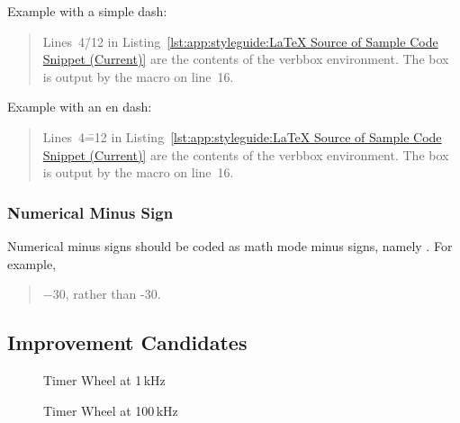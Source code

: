 Example with a simple dash:

\begin{quote}
  Lines~4\=/12 in
  Listing~\ref{lst:app:styleguide:LaTeX Source of Sample Code Snippet (Current)}
  are the contents of the verbbox environment. The box is output
  by the \co{\\theverbbox} macro on line~16.
\end{quote}

Example with an en dash:

\begin{quote}
  Lines~4\==12 in
  Listing~\ref{lst:app:styleguide:LaTeX Source of Sample Code Snippet (Current)}
  are the contents of the verbbox environment. The box is output
  by the \co{\\theverbbox} macro on line~16.
\end{quote}

\subsubsection{Numerical Minus Sign}
\label{sec:app:styleguide:Numerical Minus Sign}

Numerical minus signs should be coded as math mode minus signs,
namely \qco{$-$}. For example,

\begin{quote}
  $-30$, rather than -30.
\end{quote}

\subsection{Improvement Candidates}
\label{sec:app:styleguide:Improvement Candidates}

\begin{figure*}[tbh]\centering
\begin{minipage}[t][][t]{2.1in}
\caption{Timer Wheel at 1\,kHz}
\label{fig:app:styleguide:Timer Wheel at 1kHz}
\end{minipage}
\qquad
\begin{minipage}[t][][t]{2.3in}
\caption{Timer Wheel at 100\,kHz}
\label{fig:app:styleguide:Timer Wheel at 100kHz}
\end{minipage}
\end{figure*}


